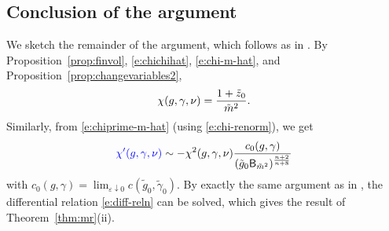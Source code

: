 
\subsection{Conclusion of the argument}
\label{sec:suscept-conc}

We sketch the remainder of the argument, which follows as in
\cite[Section~\ref{log-sec:chvar}]{BBS-saw4-log}.
By Proposition~\ref{prop:finvol}, \eqref{e:chichihat}, \eqref{e:chi-m-hat},
and Proposition~\ref{prop:changevariables2},
\begin{equation}
\label{e:chi-renorm}
\chi(g, \gamma, \nu)
	=
\frac{1 + \tilde z_0}{\tilde m^2}.
\end{equation}
Similarly, from \eqref{e:chiprime-m-hat} (using \eqref{e:chi-renorm}), we get
\begin{equation}
\label{e:diff-reln}
{\color{blue}\chi'(g, \gamma, \nu)}
	\sim
-\chi^2(g, \gamma, \nu)
\frac{c_0(g, \gamma)}{(\tilde g_0 {\sf B}_{\tilde m^2})^{\frac{n+2}{n+8}}}
\end{equation}
with $c_0(g, \gamma) = \lim_{\varepsilon\downarrow0} c(\tilde g_0, \tilde\gamma_0)$.
By exactly the same argument as in \cite[Section~\ref{log-sec:pfsuscept}]{BBS-saw4-log},
the differential relation \eqref{e:diff-reln}
can be solved, which gives the result of Theorem~\ref{thm:mr}(ii).

